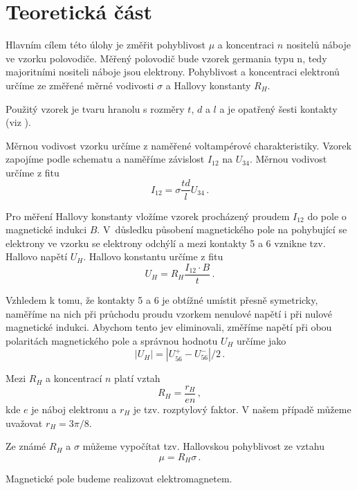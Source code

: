 \section*{Teoretická část}

Hlavním cílem této úlohy je změřit pohyblivost $\mu$ a koncentraci $n$ nositelů náboje ve vzorku polovodiče.
Měřený polovodič bude vzorek germania typu n, tedy majoritními nositeli náboje jsou elektrony.
Pohyblivost a koncentraci elektronů určíme ze změřené měrné vodivosti $\sigma$ a Hallovy konstanty $R_H$.

Použitý vzorek je tvaru hranolu s rozměry $t$, $d$ a $l$ a je opatřený šesti kontakty (viz \cite{skripta}).


Měrnou vodivost vzorku určíme z naměřené voltampérové charakteristiky.
Vzorek zapojíme podle schematu \cite{skripta} a naměříme závislost $I_{12}$ na $U_{34}$.
Měrnou vodivost určíme z fitu
\begin{equation} \label{e:vodivost}
I_{12}=\sigma \frac{td}{l} U_{34} \,.
\end{equation}


Pro měření Hallovy konstanty vložíme vzorek procházený proudem $I_{12}$ do pole o magnetické indukci $B$.
V~důsledku působení magnetického pole na pohybující se elektrony ve vzorku se elektrony odchýlí a mezi kontakty 5 a 6 vznikne tzv. Hallovo napětí $U_H$.
Hallovo konstantu určíme z fitu \cite{skripta}
\begin{equation} \label{e:hall}
U_H=R_H\frac{I_{12} \cdot B}{t} \,.
\end{equation}

Vzhledem k tomu, že kontakty 5 a 6 je obtížné umístit přesně symetricky, naměříme na nich při průchodu proudu vzorkem nenulové napětí i při nulové magnetické indukci.
Abychom tento jev eliminovali, změříme napětí při obou polaritách magnetického pole a správnou hodnotu $U_H$ určíme jako
\begin{equation}
| U_H |=|U_{56}^+ - U_{56}^-|/2 \,.
\end{equation}

Mezi $R_H$ a koncentrací $n$ platí vztah \cite{skripta}
\begin{equation} \label{eq:koncentrace}
R_H = \frac{r_H}{en} \,,
\end{equation}
kde $e$ je náboj elektronu a $r_H$ je tzv. rozptylový faktor.
V našem případě můžeme uvažovat $r_H = 3\pi/8$. \cite{skripta}

Ze známé $R_H$ a $\sigma$ můžeme vypočítat tzv. Hallovskou pohyblivost ze vztahu \cite{skripta}
\begin{equation} \label{eq:pohyblivost}
\mu = R_H \sigma \,.
\end{equation}

Magnetické pole budeme realizovat elektromagnetem.
